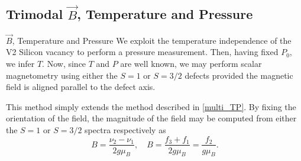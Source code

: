

\subsection{Trimodal $\vec{B}$, Temperature and Pressure}

\begin{proposal}{$\vec{B}$, Temperature and Pressure}
    We exploit the temperature independence of the V2 Silicon vacancy to perform a pressure measurement. Then, having fixed $P_0$, we infer $T$. Now, since $T$ and $P$ are well known, we may perform scalar magnetometry using either the $S=1$ or $S=3/2$ defects provided the magnetic field is aligned parallel to the defect axis. 
\end{proposal}

This method simply extends the method described in \ref{multi_TP}. By fixing the orientation of the field, the magnitude of the field may be computed from either the $S=1$ or $S=3/2$ spectra respectively as 
\begin{equation}
    B = \frac{\nu_2 - \nu_1}{2 g\mu_B }, \quad B = \frac{f_3 + f_1}{2 g \mu_B } = \frac{f_2}{g \mu_B}.  
    \label{eq:}
\end{equation}

%
%
%
%





